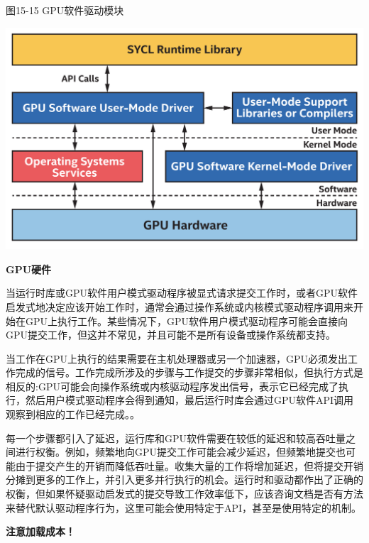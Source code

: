 \hspace*{\fill} \par %
图15-15 GPU软件驱动模块
\begin{center}
	\includegraphics[width=1.0\textwidth]{content/chapter-15/images/11}
\end{center}

\hspace*{\fill} \par %
\textbf{GPU硬件}

当运行时库或GPU软件用户模式驱动程序被显式请求提交工作时，或者GPU软件启发式地决定应该开始工作时，通常会通过操作系统或内核模式驱动程序调用来开始在GPU上执行工作。某些情况下，GPU软件用户模式驱动程序可能会直接向GPU提交工作，但这并不常见，并且可能不是所有设备或操作系统都支持。\par

当工作在GPU上执行的结果需要在主机处理器或另一个加速器，GPU必须发出工作完成的信号。工作完成所涉及的步骤与工作提交的步骤非常相似，但执行方式是相反的:GPU可能会向操作系统或内核驱动程序发出信号，表示它已经完成了执行，然后用户模式驱动程序会得到通知，最后运行时库会通过GPU软件API调用观察到相应的工作已经完成。。\par

每一个步骤都引入了延迟，运行库和GPU软件需要在较低的延迟和较高吞吐量之间进行权衡。例如，频繁地向GPU提交工作可能会减少延迟，但频繁地提交也可能由于提交产生的开销而降低吞吐量。收集大量的工作将增加延迟，但将提交开销分摊到更多的工作上，并引入更多并行执行的机会。运行时和驱动都作出了正确的权衡，但如果怀疑驱动启发式的提交导致工作效率低下，应该咨询文档是否有方法来替代默认驱动程序行为，这里可能会使用特定于API，甚至是使用特定的机制。\par

\hspace*{\fill} \par %
\textbf{注意加载成本！}

